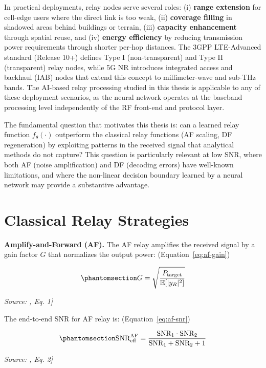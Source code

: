 In practical deployments, relay nodes serve several roles: (i) \textbf{range extension} for cell-edge users where the direct link is too weak, (ii) \textbf{coverage filling} in shadowed areas behind buildings or terrain, (iii) \textbf{capacity enhancement} through spatial reuse, and (iv) \textbf{energy efficiency} by reducing transmission power requirements through shorter per-hop distances. The 3GPP LTE-Advanced standard (Release 10+) defines Type I (non-transparent) and Type II (transparent) relay nodes, while 5G NR introduces integrated access and backhaul (IAB) nodes that extend this concept to millimeter-wave and sub-THz bands. The AI-based relay processing studied in this thesis is applicable to any of these deployment scenarios, as the neural network operates at the baseband processing level independently of the RF front-end and protocol layer.

The fundamental question that motivates this thesis is: can a learned relay function \(f_\theta(\cdot)\) outperform the classical relay functions (AF scaling, DF regeneration) by exploiting patterns in the received signal that analytical methods do not capture? This question is particularly relevant at low SNR, where both AF (noise amplification) and DF (decoding errors) have well-known limitations, and where the non-linear decision boundary learned by a neural network may provide a substantive advantage.

\section{Classical Relay Strategies}\label{sec:classical-relay-strategies}

\textbf{Amplify-and-Forward (AF).} The AF relay amplifies the received signal by a gain factor \(G\) that normalizes the output power: (Equation~\ref{eq:af-gain})

\begin{equation}\protect\phantomsection\label{eq:af-gain}{G = \sqrt{\frac{P_{\text{target}}}{\mathbb{E}[|y_R|^2]}}
}\end{equation} \par{\small\textit{Source: \cite{Laneman2004CooperativeDiversity}, Eq. 1]}}

The end-to-end SNR for AF relay is: (Equation~\ref{eq:af-snr})

\begin{equation}\protect\phantomsection\label{eq:af-snr}{\text{SNR}_{\text{eff}}^{\text{AF}} = \frac{\text{SNR}_1 \cdot \text{SNR}_2}{\text{SNR}_1 + \text{SNR}_2 + 1}
}\end{equation} \par{\small\textit{Source: \cite{Laneman2004CooperativeDiversity}, Eq. 2]}}

